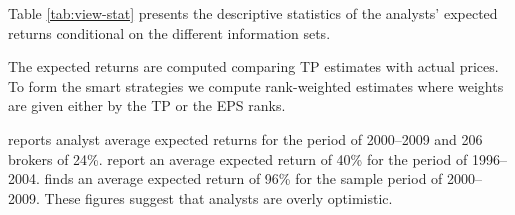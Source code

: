 \documentclass{article}\usepackage[]{graphicx}\usepackage[]{color}
\begin{document}
Table \ref{tab:view-stat} presents the descriptive statistics of the analysts' expected returns conditional on the different information sets. 


The expected returns  are computed comparing TP estimates with actual prices. To form the smart strategies we compute rank-weighted estimates where weights are given either by the TP or the EPS ranks. 

\cite{bradshaw2002} reports analyst average expected returns for the period of 2000--2009 and 206 brokers of 24\%. \cite{da2011} report an average expected return of 40\% for the period of 1996--2004. \cite{zhou2013} finds an average expected return of 96\% for the sample period of 2000--2009. These figures suggest that analysts are overly optimistic.
\end{document}
